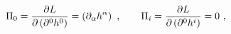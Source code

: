 \begin{equation}
\Pi _{0}=\frac{\partial L}{\partial \left( \partial ^{0}h^{0}\right) }%
=\left( \partial _{\alpha }h^{\alpha }\right) \ ,\qquad \Pi _{i}=\frac{%
\partial L}{\partial \left( \partial ^{0}h^{i}\right) }=0\ ,
\end{equation}%
